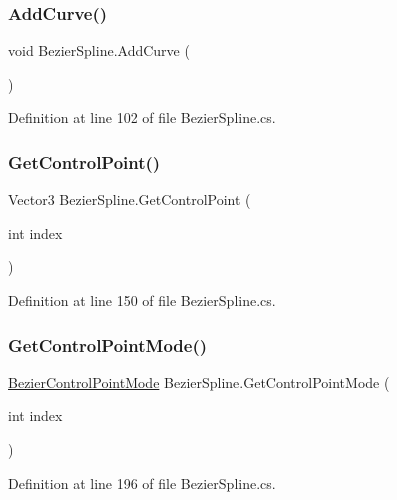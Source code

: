 \subsubsection{\texorpdfstring{Add\+Curve()}{AddCurve()}}
{\footnotesize\ttfamily void Bezier\+Spline.\+Add\+Curve (\begin{DoxyParamCaption}{ }\end{DoxyParamCaption})}



Definition at line 102 of file Bezier\+Spline.\+cs.

\mbox{\label{class_bezier_spline_aee83e5e470e3d7d23f75875c81bbd326}} 
\subsubsection{\texorpdfstring{Get\+Control\+Point()}{GetControlPoint()}}
{\footnotesize\ttfamily Vector3 Bezier\+Spline.\+Get\+Control\+Point (\begin{DoxyParamCaption}\item[{int}]{index }\end{DoxyParamCaption})}



Definition at line 150 of file Bezier\+Spline.\+cs.

\mbox{\label{class_bezier_spline_a1600b5bf35f1aa796e5fbe227b5a767d}} 
\subsubsection{\texorpdfstring{Get\+Control\+Point\+Mode()}{GetControlPointMode()}}
{\footnotesize\ttfamily \mbox{\hyperlink{_bezier_spline_follower_8cs_a41ff1a7271616f36cab397d937ee41b0}{Bezier\+Control\+Point\+Mode}} Bezier\+Spline.\+Get\+Control\+Point\+Mode (\begin{DoxyParamCaption}\item[{int}]{index }\end{DoxyParamCaption})}



Definition at line 196 of file Bezier\+Spline.\+cs.

